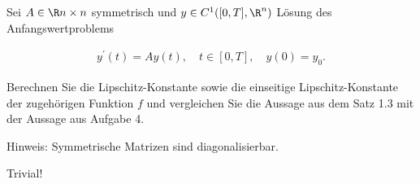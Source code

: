 \begin{exercise}

Sei $A \in \R n \times n$ symmetrisch und $y \in C^1([0, T], \R^n)$ Lösung des Anfangswertproblems

\begin{align*}
  y^\prime(t) = A y(t),
  \quad
  t \in [0, T],
  \quad
  y(0) = y_0.
\end{align*}

Berechnen Sie die Lipschitz-Konstante sowie die einseitige Lipschitz-Konstante der zugehörigen Funktion $f$ und vergleichen Sie die Aussage aus dem Satz 1.3 mit der Aussage aus Aufgabe 4.

Hinweis: Symmetrische Matrizen sind diagonalisierbar.

\end{exercise}

\begin{solution}

Trivial!

\end{solution}
